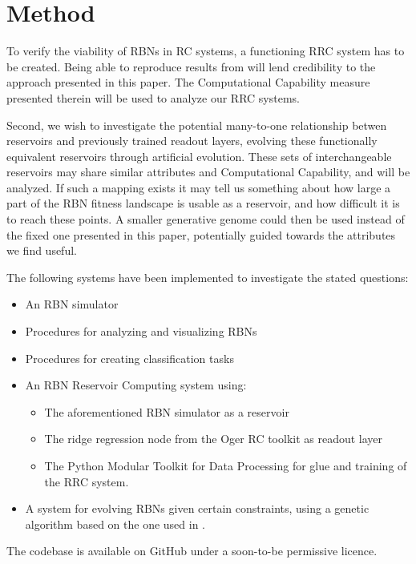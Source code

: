 \section{Method}

To verify the viability of RBNs in RC systems, a functioning RRC system has to be created.
Being able to reproduce results from \cite{rbn-reservoir} will lend credibility to the approach presented in this paper.
The Computational Capability measure presented therein will be used to analyze our RRC systems.

Second, we wish to investigate the potential many-to-one relationship betwen reservoirs and previously trained readout layers,
evolving these functionally equivalent reservoirs through artificial evolution.
These sets of interchangeable reservoirs may share similar attributes and Computational Capability,
and will be analyzed.
If such a mapping exists it may tell us something about how large a part of the RBN fitness landscape is usable as a reservoir, and how difficult it is to reach these points.
A smaller generative genome could then be used instead of the fixed one presented in this paper,
potentially guided towards the attributes we find useful.

The following systems have been implemented to investigate the stated questions:
\begin{itemize}
  \item An RBN simulator
  \item Procedures for analyzing and visualizing RBNs
  \item Procedures for creating classification tasks

  \item An RBN Reservoir Computing system using:
  \begin{itemize}
    \item The aforementioned RBN simulator as a reservoir
    \item The ridge regression node from the Oger RC toolkit \cite{verstraeten2012oger} as readout layer
    \item The Python Modular Toolkit for Data Processing \cite{zito2008modular} for glue and training of the RRC system.
  \end{itemize}
  \item A system for evolving RBNs given certain constraints, using a genetic algorithm based on the one used in \cite{farstad2015evolving}.
\end{itemize}

The codebase is available on GitHub \cite{forprosjekt-code-github} under a soon-to-be permissive licence.

